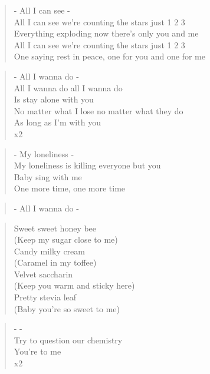 \begin{verse}
- All I can see -\\
All I can see we're counting the stars just 1 2 3\\
Everything exploding now there's only you and me\\
All I can see we're counting the stars just 1 2 3\\
One saying rest in peace, one for you and one for me
\end{verse}

\begin{verse}
- All I wanna do -\\
All I wanna do all I wanna do \\
Is stay alone with you\\
No matter what I lose no matter what they do \\
As long as I'm with you\\
x2
\end{verse}

\begin{verse}
- My loneliness -\\
My loneliness is killing everyone but you\\
Baby sing with me \\
One more time, one more time
\end{verse}

\begin{verse}
- All I wanna do - 
\end{verse}

\begin{verse}
Sweet sweet honey bee \\
(Keep my sugar close to me)\\
Candy milky cream \\
(Caramel in my toffee)\\
Velvet saccharin \\
(Keep you warm and sticky here)\\
Pretty stevia leaf \\
(Baby you're so sweet to me)
\end{verse}

\clearpage
{}

\begin{verse}
-  - \\
Try to question our chemistry \\
You're  to me\\
x2
\end{verse}

